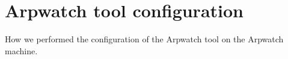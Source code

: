 \section{Arpwatch tool configuration}
How we performed the configuration of the Arpwatch tool on the
Arpwatch machine.
